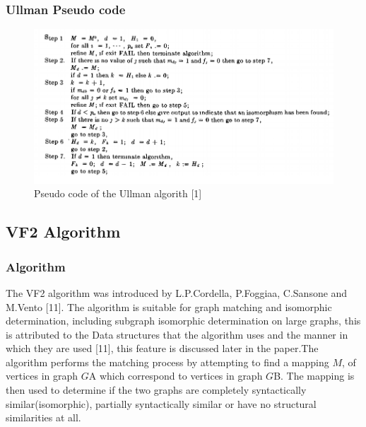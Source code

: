\subsubsection{Ullman Pseudo code}
	\begin{figure}[H]
	  \begin{center}
		  \includegraphics[width=1.0\textwidth]{Ullmanpseudo}
	  \end{center}    
	  \caption{Pseudo code of the Ullman algorith [1]}
	  \label{fig:ullmanpseudo}
	\end{figure} 
\newpage

 \subsection{VF2 Algorithm}
\label{VF2 Algorithm}

\subsubsection{Algorithm}

 The VF2 algorithm was introduced by L.P.Cordella, P.Foggiaa, C.Sansone and M.Vento [11]. The algorithm is suitable for graph matching and isomorphic determination, including subgraph isomorphic determination on large graphs, this is attributed to the Data structures that the algorithm uses and the manner in which they are used [11], this feature is discussed later in the paper.\newline\newline The algorithm performs the matching process by attempting to find a mapping $M$, of vertices in graph $G${\tiny A} which correspond to vertices in graph $G${\tiny B}. The mapping is then used to determine if the two graphs are completely syntactically similar(isomorphic), partially syntactically similar or have no structural similarities at all.

